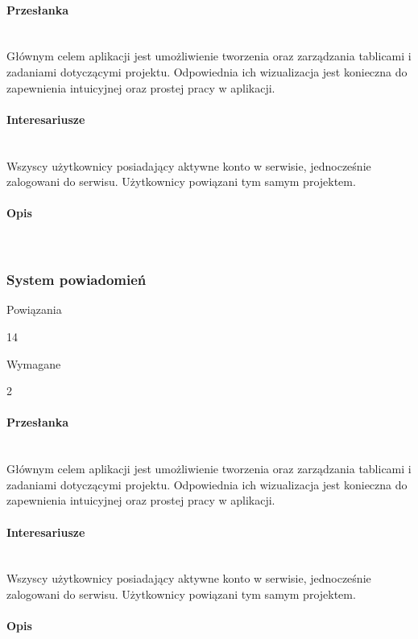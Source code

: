 \documentclass[eng,printmode]{mgr}
\begin{document}
\paragraph{Przesłanka}\ \\
Głównym celem aplikacji jest umożliwienie tworzenia oraz zarządzania tablicami i zadaniami dotyczącymi projektu. Odpowiednia ich wizualizacja jest konieczna do zapewnienia intuicyjnej oraz prostej pracy w aplikacji.

\paragraph{Interesariusze}\ \\
Wszyscy użytkownicy posiadający aktywne konto w serwisie, jednocześnie zalogowani do serwisu. Użytkownicy powiązani tym samym projektem.

\paragraph{Opis}\ \\
\newpage

\subsubsection{System powiadomień}
\begin{labeling}{Powiązania}
\item [ID:] 14
\item [Typ:] Wymagane
\item [Powiązania] 2
\end{labeling}

\paragraph{Przesłanka}\ \\
Głównym celem aplikacji jest umożliwienie tworzenia oraz zarządzania tablicami i zadaniami dotyczącymi projektu. Odpowiednia ich wizualizacja jest konieczna do zapewnienia intuicyjnej oraz prostej pracy w aplikacji.

\paragraph{Interesariusze}\ \\
Wszyscy użytkownicy posiadający aktywne konto w serwisie, jednocześnie zalogowani do serwisu. Użytkownicy powiązani tym samym projektem.

\paragraph{Opis}\ \\
\newpage
\end{document}
